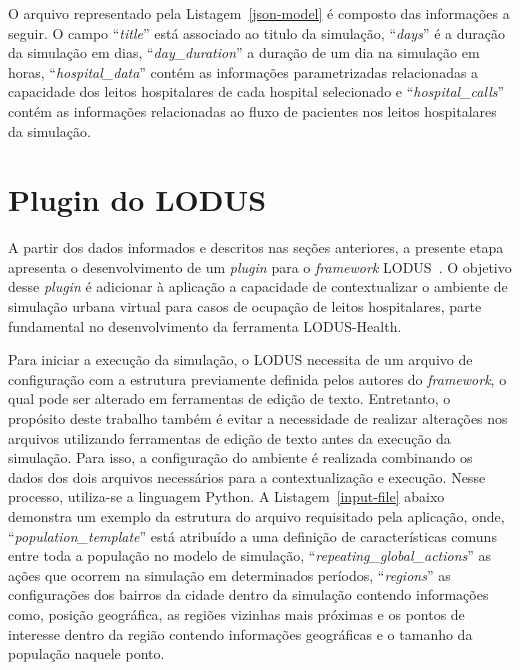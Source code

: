 O arquivo representado pela Listagem~\ref{json-model} é composto das informações a seguir. O campo ``\textit{title}'' está associado ao titulo da simulação, ``\textit{days}'' é a duração da simulação em dias, ``\textit{day\_duration}'' a duração de um dia na simulação em horas, ``\textit{hospital\_data}'' contém as informações parametrizadas relacionadas a capacidade dos leitos hospitalares de cada hospital selecionado e ``\textit{hospital\_calls}'' contém as informações relacionadas ao fluxo de pacientes nos leitos hospitalares da simulação.

\section{Plugin do LODUS}\label{sec:plugin_lodus}
A partir dos dados informados e descritos nas seções anteriores, a presente etapa apresenta o desenvolvimento de um 
\textit{plugin} para o \textit{framework} LODUS~\cite{9239083}. 
O objetivo desse \textit{plugin} é adicionar à aplicação a capacidade de contextualizar o ambiente de simulação urbana virtual para casos de ocupação de leitos hospitalares, parte fundamental no desenvolvimento da ferramenta LODUS-Health.

Para iniciar a execução da simulação, o LODUS necessita de um arquivo de configuração com a estrutura previamente definida pelos autores do \textit{framework}, o qual pode ser alterado em ferramentas de edição de texto. Entretanto, o propósito deste trabalho também é evitar a necessidade de realizar alterações nos arquivos utilizando ferramentas de edição de texto antes da execução da simulação. Para isso, a configuração do ambiente é realizada combinando os dados dos dois arquivos necessários para a contextualização e execução. Nesse processo, utiliza-se a linguagem Python. A Listagem~\ref{input-file} abaixo demonstra um exemplo da estrutura do arquivo requisitado pela aplicação, onde, ``\textit{population\_template}'' está atribuído a uma definição de características comuns entre toda a população no modelo de simulação, ``\textit{repeating\_global\_actions}'' as ações que ocorrem na simulação em determinados períodos, ``\textit{regions}'' as configurações dos bairros da cidade dentro da simulação contendo informações como, posição geográfica, as regiões vizinhas mais próximas e os pontos de interesse dentro da região contendo informações geográficas e o tamanho da população naquele ponto.


